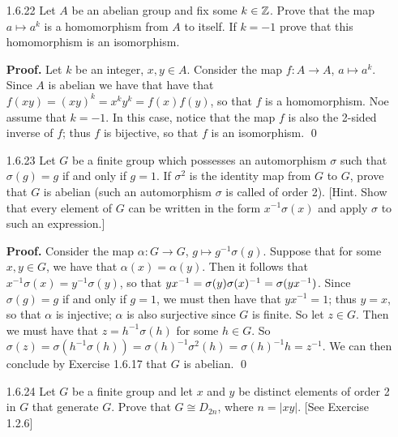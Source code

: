 \begin{enumerate}
      \textbf{Proof.} Let $k$ be a nonzero rational number. Consider the map
      $f : \Q \rightarrow \Q$, $q \mapsto kq$. Let $x, y \in Q$. We have that
      $f(x + y) = k(x + y) = kx + ky = f(x) + f(y)$, so that $f$ is a 
      homomorphism. Now suppose $f(x) = f(y)$, so that $kx = ky$. Since
      $k \neq 0$, we shall multiply the equality $kx = ky$ by $1/k$ to get
      $x = y$; i.e, $f$ is injective. Since $f(x/k) = x$, it follows that $f$ is
      onto, so that $f$ is an automorphism of $\Q$. \qed
   \item[1.6.22]  Let $A$ be an abelian group and fix some $k \in \mathbb{Z}$. Prove
                  that the map $a \mapsto a^k$ is a homomorphism from $A$ to 
                  itself. If $k = -1$ prove that this homomorphism is an
                  isomorphism.

      \textbf{Proof.} Let $k$ be an integer, $x, y \in A$. Consider the map
      $f : A \rightarrow A$, $a \mapsto a^k$. Since $A$ is abelian we have that
      have that $f(xy) = (xy)^k = x^ky^k = f(x)f(y)$, so that $f$ is a 
      homomorphism. Noe assume that $k = -1$. In this case, notice that the
      map $f$ is also the 2-sided inverse of $f$; thus $f$ is bijective, so that
      $f$ is an isomorphism. \qed
   \item[1.6.23]  Let $G$ be a finite group which possesses an automorphism
                  $\sigma$ such that $\sigma(g) = g$ if and only if $g = 1$. If
                  $\sigma^2$ is the identity map from $G$ to $G$, prove that $G$
                  is abelian (such an automorphism $\sigma$ is called
                   of order 2). [Hint. Show that every
                  element of $G$ can be written in the form $x^{-1}\sigma(x)$
                  and apply $\sigma$ to such an expression.]

      \textbf{Proof.} Consider the map $\alpha : G \rightarrow G$,
      $g \mapsto g^{-1}\sigma(g)$. Suppose that for some $x, y \in G$, we have
      that $\alpha(x) = \alpha(y)$. Then it follows that
      $x^{-1}\sigma(x) = y^{-1}\sigma(y)$, so that
      $yx^{-1} =\nobreak \sigma(y)\sigma(x)^{-1} = \sigma(yx^{-1})$. Since
      $\sigma(g) = g$ if and only if $g = 1$, we must then have that
      $yx^{-1} = 1$; thus $y = x$, so that $\alpha$ is injective; $\alpha$ is
      also surjective since $G$ is finite. So let $z \in G$. Then we must have 
      that $z = h^{-1}\sigma(h)$ for some $h \in G$. So
      $\sigma(z) = \sigma(h^{-1}\sigma(h)) = \sigma(h)^{-1}\sigma^2(h) =
       \sigma(h)^{-1}h = z^{-1}$. We can then conclude by Exercise 1.6.17 that
      $G$ is abelian. \qed
   \item[1.6.24]  Let $G$ be a finite group and let $x$ and $y$ be distinct
                  elements of order 2 in $G$ that generate $G$. Prove that
                  $G \cong D_{2n}$, where $n = |xy|$. [See Exercise 1.2.6]
                  

\end{enumerate}
